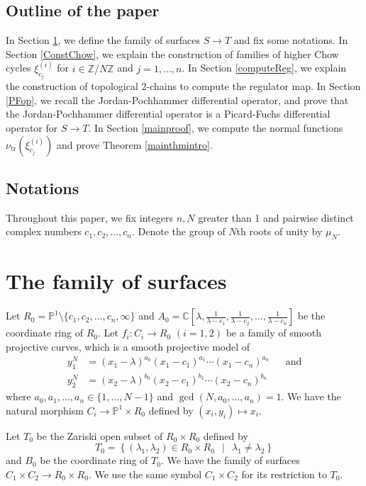 \documentclass[letterpaper, 11pt]{amsart}
\theoremstyle{my theoremstyle}
\theoremstyle{dfn}
\theoremstyle{remark}
\renewcommand{\1}{\mathbbm{1}}
\newcommand{\C}{\mathbb{C}}
\newcommand{\Z}{\mathbb{Z}}
\renewcommand{\P}{\mathbb{P}}
\renewcommand{\l}{\lambda}
\numberwithin{equation}{section}
\begin{document}
\subsection{Outline of the paper}
In Section \ref{SurfaceFamily}, we define the family of surfaces $S\to T$ and fix some notations.
In Section \ref{ConstChow}, we explain the construction of families of higher Chow cycles $\xi_{c_j}^{(i)}$ for $i \in \Z/N\Z$ and $j=1, \ldots, n$. 
In Section \ref{computeReg}, we explain the construction of topological $2$-chains to compute the regulator map. 
In Section \ref{PFop}, we recall the Jordan-Pochhammer differential operator, and prove that the Jordan-Pochhammer differential operator is a Picard-Fuchs differential operator for $S \to T$.
In Section \ref{mainproof}, we compute the normal functions $\nu_{\mathrm{tr}}(\xi_{c_j}^{(i)})$ and prove Theorem \ref{mainthmintro}. 

\subsection{Notations}
Throughout this paper, we fix integers $n,N$ greater than 1 and pairwise distinct complex numbers $c_1,c_2,\dots, c_n$. 
Denote the group of $N$th roots of unity by  $\mu_N$.


\section{The family of surfaces} \label{SurfaceFamily}
Let $R_0=\P^1 \setminus \{c_1,c_2,\dots, c_n,\infty\}$ and $A_0=\C\left[\l, \frac1{\l-c_1},\frac{1}{\l-c_2},\dots, \frac{1}{\l-c_n} \right]$ be the coordinate ring of $R_0$. 
Let $f_i \colon C_i \to R_0$ $(i=1, 2)$ be a family of smooth projective curves, which is a smooth projective model of 
\begin{equation*}
\begin{aligned}
y_1^N&=(x_1-\l)^{a_0}(x_1 -c_1)^{a_1} \cdots (x_1-c_n)^{a_n} && \text{and}\\
y_2^N&=(x_2-\l)^{b_0}(x_2 -c_1)^{b_1} \cdots (x_2-c_n)^{b_n}
\end{aligned}
\end{equation*}
where $a_0,a_1,\dots,a_n \in \{1, \ldots, N-1\}$ and $\gcd(N, a_0, \ldots, a_n)=1$. 
We have the natural morphism $C_i \to \P^1 \times R_0$ defined by $(x_i, y_i) \mapsto x_i$.  

Let $T_0$ be the Zariski open subset of $R_0 \times R_0$ defined by 
$$T_0=\left\{ (\l_1, \l_2) \in R_0 \times R_0 \:\: \middle| \:\:  \l_1 \neq \l_2\right\}$$ 
and $B_0$ be the coordinate ring of $T_0$. 
We have the family of surfaces $C_1\times C_2\rightarrow R_0\times R_0$.
We use the same symbol $C_1\times C_2$ for its restriction to $T_0$.
\end{document}
